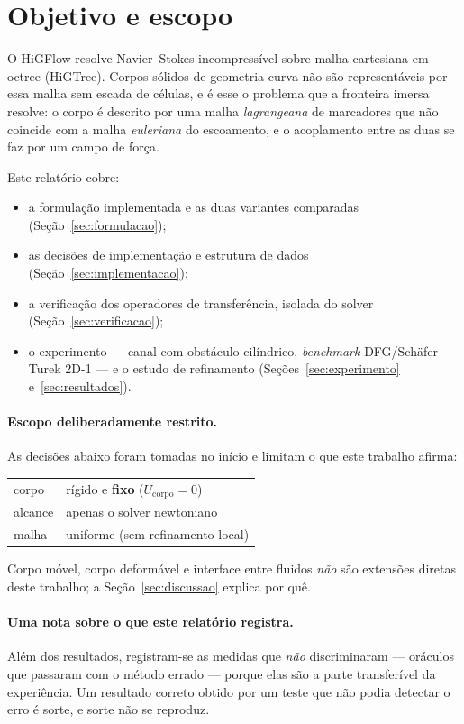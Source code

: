 \section{Objetivo e escopo}

O HiGFlow resolve Navier--Stokes incompressível sobre malha cartesiana em
octree (HiGTree). Corpos sólidos de geometria curva não são representáveis por
essa malha sem escada de células, e é esse o problema que a fronteira imersa
resolve: o corpo é descrito por uma malha \emph{lagrangeana} de marcadores que
não coincide com a malha \emph{euleriana} do escoamento, e o acoplamento entre
as duas se faz por um campo de força.

Este relatório cobre:

\begin{itemize}
  \item a formulação implementada e as duas variantes comparadas
        (Seção~\ref{sec:formulacao});
  \item as decisões de implementação e estrutura de dados
        (Seção~\ref{sec:implementacao});
  \item a verificação dos operadores de transferência, isolada do solver
        (Seção~\ref{sec:verificacao});
  \item o experimento --- canal com obstáculo cilíndrico, \emph{benchmark}
        DFG/Schäfer--Turek 2D-1 --- e o estudo de refinamento
        (Seções~\ref{sec:experimento} e~\ref{sec:resultados}).
\end{itemize}

\paragraph{Escopo deliberadamente restrito.} As decisões abaixo foram tomadas no
início e limitam o que este trabalho afirma:

\begin{center}
\begin{tabular}{ll}
  \toprule
  corpo    & rígido e \textbf{fixo} ($U_{\mathrm{corpo}} = 0$) \\
  alcance  & apenas o solver newtoniano \\
  malha    & uniforme (sem refinamento local) \\
  \bottomrule
\end{tabular}
\end{center}

Corpo móvel, corpo deformável e interface entre fluidos \emph{não} são
extensões diretas deste trabalho; a Seção~\ref{sec:discussao} explica por quê.

\paragraph{Uma nota sobre o que este relatório registra.} Além dos resultados,
registram-se as medidas que \emph{não} discriminaram --- oráculos que passaram
com o método errado --- porque elas são a parte transferível da experiência. Um
resultado correto obtido por um teste que não podia detectar o erro é sorte, e
sorte não se reproduz.
